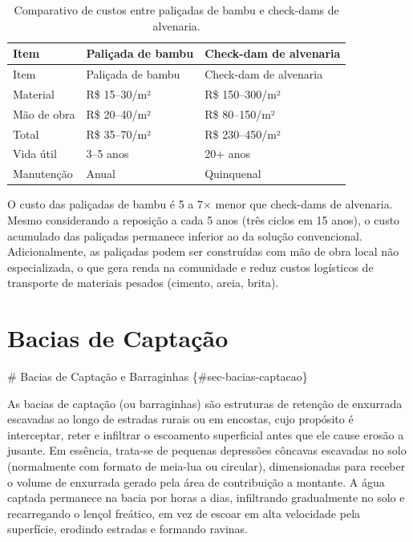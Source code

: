 \documentclass[
  portuguese,
  11pt,
  a4paper,
  open=any]{scrbook}
\begin{document}
\begin{longtable}[]{@{}lll@{}}
\caption{Comparativo de custos entre paliçadas de bambu e check-dams de
alvenaria.}\label{tbl-custos-palicada}\tabularnewline
\toprule\noalign{}
Item & Paliçada de bambu & Check-dam de alvenaria \\
\midrule\noalign{}
\endfirsthead
\toprule\noalign{}
Item & Paliçada de bambu & Check-dam de alvenaria \\
\midrule\noalign{}
\endhead
\bottomrule\noalign{}
\endlastfoot
Material & R\$ 15--30/m² & R\$ 150--300/m² \\
Mão de obra & R\$ 20--40/m² & R\$ 80--150/m² \\
Total & R\$ 35--70/m² & R\$ 230--450/m² \\
Vida útil & 3--5 anos & 20+ anos \\
Manutenção & Anual & Quinquenal \\
\end{longtable}

\begin{tcolorbox}[enhanced jigsaw, leftrule=.75mm, colframe=quarto-callout-tip-color-frame, colback=white, bottomrule=.15mm, opacityback=0, colbacktitle=quarto-callout-tip-color!10!white, breakable, bottomtitle=1mm, opacitybacktitle=0.6, title=\textcolor{quarto-callout-tip-color}{\faLightbulb}\hspace{0.5em}{Vantagem econômica}, titlerule=0mm, toprule=.15mm, toptitle=1mm, rightrule=.15mm, left=2mm, arc=.35mm, coltitle=black]

O custo das paliçadas de bambu é 5 a 7× menor que check-dams de
alvenaria. Mesmo considerando a reposição a cada 5 anos (três ciclos em
15 anos), o custo acumulado das paliçadas permanece inferior ao da
solução convencional. Adicionalmente, as paliçadas podem ser construídas
com mão de obra local não especializada, o que gera renda na comunidade
e reduz custos logísticos de transporte de materiais pesados (cimento,
areia, brita).

\end{tcolorbox}

\chapter{Bacias de Captação}\label{bacias-de-captauxe7uxe3o}

\# Bacias de Captação e Barraginhas \{\#sec-bacias-captacao\}

As bacias de captação (ou barraginhas) são estruturas de retenção de
enxurrada escavadas ao longo de estradas rurais ou em encostas, cujo
propósito é interceptar, reter e infiltrar o escoamento superficial
antes que ele cause erosão a jusante. Em essência, trata-se de pequenas
depressões côncavas escavadas no solo (normalmente com formato de
meia-lua ou circular), dimensionadas para receber o volume de enxurrada
gerado pela área de contribuição a montante. A água captada permanece na
bacia por horas a dias, infiltrando gradualmente no solo e recarregando
o lençol freático, em vez de escoar em alta velocidade pela superfície,
erodindo estradas e formando ravinas.
\end{document}
